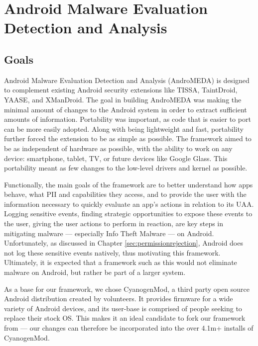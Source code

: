 \chapter{Android Malware Evaluation Detection and Analysis}
\label{sec:architecture}

\section{Goals}
Android Malware Evaluation Detection and Analysis (AndroMEDA) is designed to complement existing Android security extensions like TISSA\citep{zhou2011taming}, TaintDroid\citep{enck2010taintdroid}, YAASE\citep{russello2011yaase}, and XManDroid\citep{bugiel2011xmandroid}. The goal in building AndroMEDA was making the minimal amount of changes to the Android system in order to extract sufficient amounts of information. Portability was important, as code that is easier to port can be more easily adopted. Along with being lightweight and fast, portability further forced the extension to be as simple as possible. The framework aimed to be as independent of hardware as possible, with the ability to work on any device: smartphone, tablet, TV, or future devices like Google Glass. This portability meant as few changes to the low-level drivers and kernel as possible.

Functionally, the main goals of the framework are to better understand how apps behave, what PII and capabilities they access, and to provide the user with the information necessary to quickly evaluate an app's actions in relation to its UAA. Logging sensitive events, finding strategic opportunities to expose these events to the user, giving the user actions to perform in reaction, are key steps in mitigating malware --- especially Info Theft Malware --- on Android. Unfortunately, as discussed in Chapter \ref{sec:permissionrejection}, Android does not log these sensitive events natively, thus motivating this framework. Ultimately, it is expected that a framework such as this would not eliminate malware on Android, but rather be part of a larger system.

As a base for our framework, we chose CyanogenMod\citep{cyanogenmod}, a third party open source Android distribution created by volunteers. It provides firmware for a wide variety of Android devices, and its user-base is comprised of people seeking to replace their stock OS. This makes it an ideal candidate to fork our framework from --- our changes can therefore be incorporated into the over 4.1m+ installs of CyanogenMod\citep{cyanogenmodstats}.

